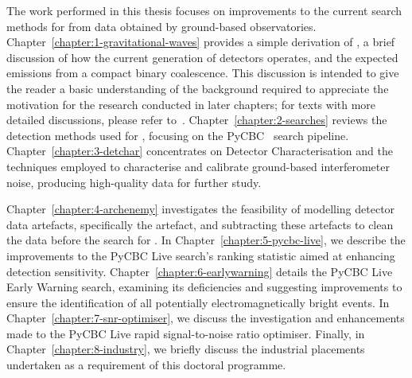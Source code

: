 The work performed in this thesis focuses on improvements to the current search methods for \gws from data obtained by ground-based \gwadj observatories. Chapter~\ref{chapter:1-gravitational-waves} provides a simple derivation of \gws, a brief discussion of how the current generation of detectors operates, and the expected \gwadj emissions from a compact binary coalescence. This discussion is intended to give the reader a basic understanding of the background required to appreciate the motivation for the research conducted in later chapters; for texts with more detailed discussions, please refer to~\cite{Moore_book:2012, Maggiore_book:2007, Schutz_book:2009, Creighton_book:2009}. Chapter~\ref{chapter:2-searches} reviews the detection methods used for \gws, focusing on the PyCBC~\cite{PyCBC:2016} search pipeline. Chapter~\ref{chapter:3-detchar} concentrates on Detector Characterisation and the techniques employed to characterise and calibrate ground-based interferometer noise, producing high-quality data for further study.

Chapter~\ref{chapter:4-archenemy} investigates the feasibility of modelling \gwadj detector data artefacts, specifically the \scladj artefact, and subtracting these artefacts to clean the data before the search for \gws. In Chapter~\ref{chapter:5-pycbc-live}, we describe the improvements to the PyCBC Live search's ranking statistic aimed at enhancing detection sensitivity. Chapter~\ref{chapter:6-earlywarning} details the PyCBC Live Early Warning search, examining its deficiencies and suggesting improvements to ensure the identification of all potentially electromagnetically bright events. In Chapter~\ref{chapter:7-snr-optimiser}, we discuss the investigation and enhancements made to the PyCBC Live rapid signal-to-noise ratio optimiser. Finally, in Chapter~\ref{chapter:8-industry}, we briefly discuss the industrial placements undertaken as a requirement of this doctoral programme.
